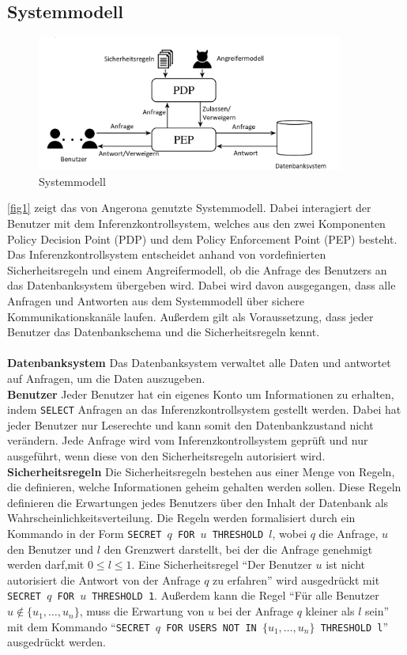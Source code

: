 \documentclass[german,version-2020-11]{uzl-thesis}
\begin{document}
\subsection{Systemmodell}
\begin{figure}[ht]
	\centering
	\includegraphics[width=0.9\textwidth]{System-model.PNG}
	\caption{Systemmodell}
	\label{fig1}
\end{figure}
\noindent 
\autoref{fig1} zeigt das von Angerona genutzte Systemmodell. Dabei interagiert der Benutzer mit dem Inferenzkontrollsystem, welches aus den zwei Komponenten Policy Decision Point (PDP) und dem Policy Enforcement Point (PEP) besteht. Das Inferenzkontrollsystem entscheidet anhand von vordefinierten Sicherheitsregeln und einem Angreifermodell, ob die Anfrage des Benutzers an das Datenbanksystem übergeben wird. Dabei wird davon ausgegangen, dass alle Anfragen und Antworten aus dem Systemmodell über sichere Kommunikationskanäle laufen. Außerdem gilt als Voraussetzung, dass jeder Benutzer das Datenbankschema und die Sicherheitsregeln kennt. \\ \\ 
\textbf{Datenbanksystem} Das Datenbanksystem verwaltet alle Daten und antwortet auf Anfragen, um die Daten auszugeben. \\
\textbf{Benutzer} Jeder Benutzer hat ein eigenes Konto um Informationen zu erhalten, indem \texttt{SELECT} Anfragen an das Inferenzkontrollsystem gestellt werden. Dabei hat jeder Benutzer nur Leserechte und kann somit den Datenbankzustand nicht verändern. Jede Anfrage wird vom Inferenzkontrollsystem geprüft und nur ausgeführt, wenn diese von den Sicherheitsregeln autorisiert wird. \\ 
\textbf{Sicherheitsregeln} Die Sicherheitsregeln bestehen aus einer Menge von Regeln, die definieren, welche Informationen geheim gehalten werden sollen. Diese Regeln definieren die Erwartungen jedes Benutzers über den Inhalt der Datenbank als Wahrscheinlichkeitsverteilung. Die Regeln werden formalisiert durch ein Kommando in der Form \texttt{SECRET $q$ FOR $u$ THRESHOLD $l$}, wobei $q$ die Anfrage, $u$ den Benutzer und $l$ den Grenzwert darstellt, bei der die Anfrage genehmigt werden darf,mit $0 \leq l \leq 1$. Eine Sicherheitsregel \enquote{Der Benutzer $u$ ist nicht autorisiert die Antwort von der Anfrage $q$ zu erfahren} wird ausgedrückt mit \texttt{SECRET $q$ FOR $u$ THRESHOLD 1}. Außerdem kann die Regel \enquote{Für alle Benutzer $u \notin \{u_1,\dots,u_n\}$, muss die Erwartung von $u$ bei der Anfrage $q$ kleiner als $l$ sein} mit dem Kommando \enquote{\texttt{SECRET $q$ FOR USERS NOT IN $\{u_1,\dots,u_n\}$ THRESHOLD l}} ausgedrückt werden.\\ 
\end{document}

